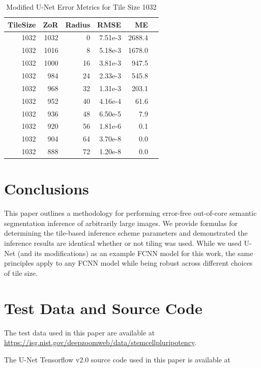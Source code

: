 \documentclass[letterpaper]{article} %
\begin{document}
\begin{table}[h!]
	\centering
		\caption{Modified U-Net Error Metrics for Tile Size 1032}
		\label{tab:tile_size_1032}
		\begin{tabular}{rrrrrr}
			TileSize & ZoR & Radius & RMSE    & ME \\ 
			\hline
1032 & 1032 & 0 & 7.51e-3  & 2688.4 \\
1032 & 1016 & 8 & 5.18e-3  & 1678.0 \\
1032 & 1000 & 16 & 3.81e-3 & 947.5 \\
1032 & 984 & 24 & 2.33e-3  & 545.8 \\
1032 & 968 & 32 & 1.31e-3  & 203.1 \\
1032 & 952 & 40 & 4.16e-4  & 61.6 \\
1032 & 936 & 48 & 6.50e-5  & 7.9 \\
1032 & 920 & 56 & 1.81e-6  & 0.1 \\
1032 & 904 & 64 & 3.70e-8  & 0.0 \\
1032 & 888 & 72 & 1.20e-8  & 0.0 \\
		\end{tabular}
\end{table}


\section{Conclusions}
\label{conclusion}

This paper outlines a methodology for performing error-free out-of-core semantic segmentation inference of arbitrarily large images. 
We provide formulas for determining the tile-based inference scheme parameters and demonstrated the inference results are identical whether or not tiling was used.
While we used U-Net (and its modifications) as an example FCNN model for this work, the same principles apply to any FCNN model while being robust across different choices of tile size. 


\section{Test Data and Source Code}
The test data used in this paper are available at 
\url{https://isg.nist.gov/deepzoomweb/data/stemcellpluripotency}. 

The U-Net Tensorflow v2.0 source code used in this paper is available at
\end{document}

